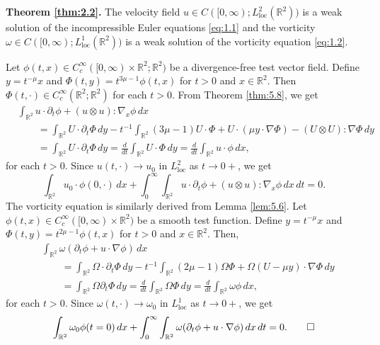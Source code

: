 \documentclass[11pt]{article}
\makeatletter
\renewenvironment{proof}[1][\proofname]{\par
  \vspace{-.7\topsep}%
  \pushQED{\qed}%
  \normalfont
  \topsep0pt \partopsep0pt %
  \trivlist
  \item[\hskip\labelsep
        \itshape
    #1\@addpunct{.}]\ignorespaces
}{%
  \popQED\endtrivlist\@endpefalse
  \addvspace{6pt plus 6pt} %
}
\theoremstyle{definition}
\theoremstyle{remark}
\numberwithin{equation}{section}
\newcommand{\tbf}{\textbf}
\newcommand{\mbb}{\mathbb}
\newcommand{\R}{\mbb{R}}
\newcommand{\del}{\partial}
\newcommand{\grad}{\nabla}
\makeatother
\begin{document}
\noindent\tbf{Theorem \ref{thm:2.2}.} The velocity field $u \in C([0,\infty); L^2_{\text{loc}}(\R^2))$ is a weak solution of the incompressible Euler equations \eqref{eq:1.1} and the vorticity $\omega\in C([0,\infty); L^1_{\text{loc}}(\R^2))$ is a weak solution of the vorticity equation \eqref{eq:1.2}.

\vspace{.5em}\begin{proof}
Let $\phi(t,x) \in C^\infty_c([0,\infty) \times \R^2; \R^2)$ be a divergence-free test vector field. Define $y = t^{-\mu} x$ and $\Phi(t,y) = t^{3\mu-1} \phi(t,x)$ for $t>0$ and $x\in\R^2$. Then $\Phi(t,\cdot) \in C^\infty_c(\R^2;\R^2)$ for each $t>0$. From Theorem \ref{thm:5.8}, we get
\begin{align*}
& \int_{\R^2} u \cdot \del_t \phi + (u \otimes u):\grad_x \phi \,dx \\
& \qquad = \int_{\R^2} U \cdot \del_t \Phi \,dy - t^{-1} \int_{\R^2} (3\mu - 1) U \cdot \Phi + U \cdot (\mu y \cdot \grad \Phi) - (U \otimes U) : \grad \Phi \,dy \\
& \qquad = \int_{\R^2} U \cdot \del_t \Phi \,dy = \frac{d}{dt} \int_{\R^2} U \cdot \Phi \,dy = \frac{d}{dt} \int_{\R^2} u \cdot \phi \,dx,
\end{align*}
for each $t> 0$. Since $u(t,\cdot) \to u_0$ in $L^2_{\text{loc}}$ as $t\to 0+$, we get
\[ \int_{\R^2} u_0 \cdot \phi(0, \cdot) \,dx + \int_0^\infty \int_{\R^2} u \cdot \del_t \phi + (u\otimes u) : \grad_x \phi \,dx \,dt = 0. \]
The vorticity equation is similarly derived from Lemma \ref{lem:5.6}. Let $\phi(t,x)\in C^\infty_c([0,\infty)\times \R^2)$ be a smooth test function. Define $y = t^{-\mu} x$ and $\Phi(t,y) = t^{2\mu - 1} \phi(t,x)$ for $t>0$ and $x\in \R^2$. Then,
\begin{align*}
& \int_{\R^2} \omega (\del_t \phi + u\cdot \grad \phi) \,dx \\
& \qquad = \int_{\R^2} \Omega \cdot \del_t \Phi \,dy - t^{-1} \int_{\R^2} (2\mu - 1) \Omega \Phi + \Omega(U-\mu y)\cdot \grad\Phi \,dy \\
& \qquad = \int_{\R^2}  \Omega \del_t \Phi \,dy = \frac{d}{dt} \int_{\R^2} \Omega \Phi \,dy = \frac{d}{dt} \int_{\R^2} \omega \phi \,dx,
\end{align*}
for each $t>0$. Since $\omega(t,\cdot)\to \omega_0$ in $L^1_{\text{loc}}$ as $t\to 0+$, we get
\[\int_{\R^2} \omega_0 \phi(t=0) \,dx + \int_0^\infty \int_{\R^2} \omega (\del_t \phi + u \cdot \grad \phi) \,dx\,dt = 0. \qedhere\]
\end{proof}
\end{document}
